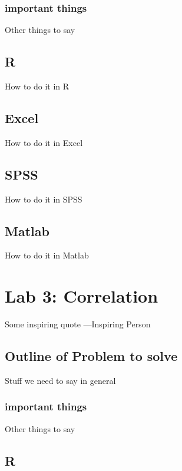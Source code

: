 \documentclass[]{book}
\theoremstyle{definition}
\theoremstyle{definition}
\theoremstyle{definition}
\theoremstyle{remark}
\begin{document}
\subsection{important things}\label{important-things}

Other things to say

\section{R}\label{r-2}

How to do it in R

\section{Excel}\label{excel-1}

How to do it in Excel

\section{SPSS}\label{spss-1}

How to do it in SPSS

\section{Matlab}\label{matlab-1}

How to do it in Matlab

\chapter{Lab 3: Correlation}\label{lab-3-correlation}

{ Some inspiring quote ---Inspiring Person }

\section{Outline of Problem to
solve}\label{outline-of-problem-to-solve-1}

Stuff we need to say in general

\subsection{important things}\label{important-things-1}

Other things to say

\section{R}\label{r-3}
\end{document}
